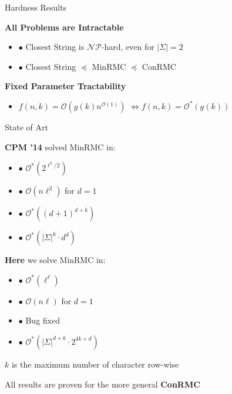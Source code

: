 \documentclass{beamer}
\renewcommand{\l}{\left}
\renewcommand{\r}{\right}
\begin{document}
\begin{frame}{Hardness Results}

  \begin{center}
    \textbf{All Problems are Intractable}
  \end{center}

  \begin{itemize}
  \item $\bullet$ Closest String is $\mathcal{NP}$-hard, even for
    $|\Sigma| = 2$
  \item $\bullet$ Closest String $\preceq$ MinRMC %
    $\preceq$ ConRMC
  \end{itemize}
\pause
  \begin{center}
    \textbf{Fixed Parameter Tractability}
  \end{center}
  
  \begin{itemize}
  \item $f(n, k) = \mathcal{O}\l(g(k) n^{\mathcal{O}(1)}\r)$ \pause
    $ \iff f(n, k) = \mathcal{O}^* \l(g(k)\r)$
  \end{itemize}
\end{frame}

\begin{frame}{State of Art}
\begin{minipage}{.45 \textwidth}
  \begin{center}
    \textbf{CPM '14} solved MinRMC in:
  \end{center}
  \begin{itemize}
  \item $\bullet$ $\mathcal{O}^*\l(2^{\ell^2 / 2}\r)$
  \item $\bullet$ $\mathcal{O}\l(n \ell^2\r)$ for $d = 1$
  \item $\bullet$ $\mathcal{O}^*\l((d + 1)^{d + k}\r)$
  \item $\bullet$ $\mathcal{O}^*\l(|\Sigma|^k \cdot
    d^d\r)$
  \end{itemize}
\end{minipage}
\hfill
\begin{minipage}{.45 \textwidth}
  \begin{center}
    \textbf{Here} we solve MinRMC in:
  \end{center}\begin{itemize}
  \item $\bullet$ $\mathcal{O}^*\l(\ell^\ell\r)$
  \item $\bullet$ $\mathcal{O}\l(n \ell\r)$ for $d = 1$
  \item $\bullet$ Bug fixed
  \item $\bullet$ $\mathcal{O}^*\l(|\Sigma|^{d+ k} \cdot 2^{4k + d}\r)$
  \end{itemize}
\end{minipage}
\pause
\vspace{2em}
\begin{center}
  $k$ is the maximum number of character row-wise
\end{center}
\begin{center}
  All results are proven for the more general \textbf{ConRMC}
\end{center}

\end{frame}
\end{document}
